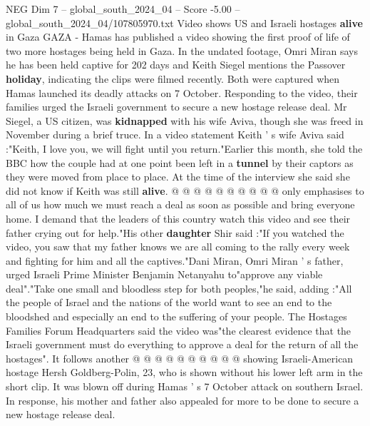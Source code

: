 \begin{textsample}{NEG Dim 7 – global\_south\_2024\_04 – Score -5.00 – global\_south\_2024\_04/107805970.txt}  \label{ex:f7_neg_346}
Video shows US and Israeli hostages \textbf{alive} in Gaza GAZA - Hamas has published a video showing the first proof of life of two more hostages being held in Gaza.
In the undated footage, Omri Miran says he has been held captive for 202 days and Keith Siegel mentions the Passover \textbf{holiday}, indicating the clips were filmed recently.
Both were captured when Hamas launched its deadly attacks on 7 October.
Responding to the video, their families urged the Israeli government to secure a new hostage release deal.
Mr Siegel, a US citizen, was \textbf{kidnapped} with his wife Aviva, though she was freed in November during a brief truce.
In a video statement Keith ' s wife Aviva said :"Keith, I love you, we will fight until you return."Earlier this month, she told the BBC how the couple had at one point been left in a \textbf{tunnel} by their captors as they were moved from place to place.
At the time of the interview she said she did not know if Keith was still \textbf{alive}. @ @ @ @ @ @ @ @ @ @ only emphasises to all of us how much we must reach a deal as soon as possible and bring everyone home.
I demand that the leaders of this country watch this video and see their father crying out for help."His other \textbf{daughter} Shir said :"If you watched the video, you saw that my father knows we are all coming to the rally every week and fighting for him and all the captives."Dani Miran, Omri Miran ' s father, urged Israeli Prime Minister Benjamin Netanyahu to"approve any viable deal"."Take one small and bloodless step for both peoples,"he said, adding :"All the people of Israel and the nations of the world want to see an end to the bloodshed and especially an end to the suffering of your people.
The Hostages Families Forum Headquarters said the video was"the clearest evidence that the Israeli government must do everything to approve a deal for the return of all the hostages".
It follows another @ @ @ @ @ @ @ @ @ @ showing Israeli-American hostage Hersh Goldberg-Polin, 23, who is shown without his lower left arm in the short clip.
It was blown off during Hamas ' s 7 October attack on southern Israel.
In response, his mother and father also appealed for more to be done to secure a new hostage release deal.

\end{textsample}
